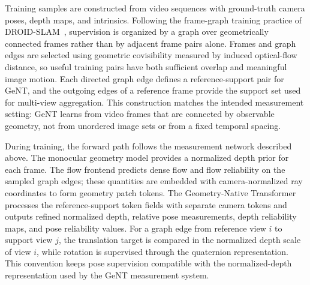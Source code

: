 Training samples are constructed from video sequences with ground-truth camera poses, depth maps, and intrinsics.
Following the frame-graph training practice of DROID-SLAM~\cite{teed2021droid}, supervision is organized by a graph over geometrically connected frames rather than by adjacent frame pairs alone.
Frames and graph edges are selected using geometric covisibility measured by induced optical-flow distance, so useful training pairs have both sufficient overlap and meaningful image motion.
Each directed graph edge defines a reference-support pair for GeNT, and the outgoing edges of a reference frame provide the support set used for multi-view aggregation.
This construction matches the intended measurement setting: GeNT learns from video frames that are connected by observable geometry, not from unordered image sets or from a fixed temporal spacing.

During training, the forward path follows the measurement network described above.
The monocular geometry model provides a normalized depth prior for each frame.
The flow frontend predicts dense flow and flow reliability on the sampled graph edges; these quantities are embedded with camera-normalized ray coordinates to form geometry patch tokens.
The Geometry-Native Transformer processes the reference-support token fields with separate camera tokens and outputs refined normalized depth, relative pose measurements, depth reliability maps, and pose reliability values.
For a graph edge from reference view $i$ to support view $j$, the translation target is compared in the normalized depth scale of view $i$, while rotation is supervised through the quaternion representation.
This convention keeps pose supervision compatible with the normalized-depth representation used by the GeNT measurement system.

